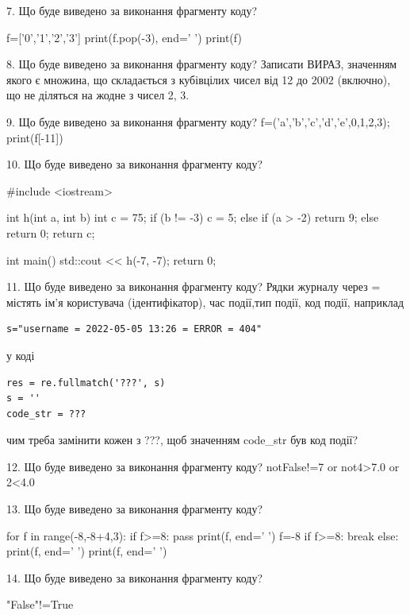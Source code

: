 \documentclass[11pt]{article}
\begin{document}

7. Що буде виведено за виконання фрагменту коду?

f=['0','1','2','3']
print(f.pop(-3), end=' ')
print(f)



8. Що буде виведено за виконання фрагменту коду?
Записати ВИРАЗ, значенням якого є множина, що складається з кубівцілих чисел від 12 до 2002 (включно), що не діляться на жодне з чисел 2, 3.

9. Що буде виведено за виконання фрагменту коду?
f=('a','b','c','d','e',0,1,2,3); print(f[-11])

10. Що буде виведено за виконання фрагменту коду?

#include <iostream>

int h(int a, int b){
    int c = 75;
    if (b != -3)
        c = 5;
    else if (a > -2)
         return 9;
    else 
        return 0;
    return c;
}

int main(){
    std::cout << h(-7, -7);
    return 0;
}


11. Що буде виведено за виконання фрагменту коду?
Рядки журналу через = містять ім'я користувача (ідентифікатор), час події,тип події, код події, наприклад
\begin{verbatim}
s="username = 2022-05-05 13:26 = ERROR = 404"
\end{verbatim}
у коді 
\begin{verbatim}
res = re.fullmatch('???', s) 
s = ''
code_str = ??? 
\end{verbatim}
чим треба замінити кожен з ???, щоб значенням code\_str був код події? 




12. Що буде виведено за виконання фрагменту коду?
notFalse!=7 or not4>7.0 or 2<4.0

13. Що буде виведено за виконання фрагменту коду?

for f in range(-8,-8+4,3):
    if f>=8:
        pass
    print(f, end=' ')
    f=-8
    if f>=8:
        break
else:
    print(f, end=' ')
print(f, end=' ')


14. Що буде виведено за виконання фрагменту коду?

"False"!=True
\end{document}
